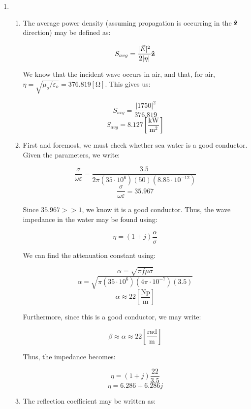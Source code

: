 \begin{enumerate}

  \item

    \begin{enumerate}

      \item 

        The average power density (assuming propagation is occurring in the $\bold{\hat{z}}$ direction) may be defined as:

        $$S_{avg}=\frac{|\vec{E}|^2}{2|\eta|}\bold{\hat{z}}$$

        We know that the incident wave occurs in air, and that, for air, $\eta=\sqrt{\mu_o/\varepsilon_o}=376.819[\si{\ohm}]$. This gives us:

        $$S_{avg}=\frac{|1750|^2}{376.819}$$
        $$\boxed{S_{avg}=8.127\left[ \frac{\si{\kilo\watt}}{\si{\meter\squared}} \right]}$$

      \item 

        First and foremost, we must check whether sea water is a good conductor. Given the parameters, we write:

        $$\frac{\sigma}{\omega\varepsilon}=\frac{3.5}{2\pi(35\cdot10^6)(50)(8.85\cdot10^{-12})}$$
        $$\frac{\sigma}{\omega\varepsilon}=35.967$$

        Since $35.967>>1$, we know it is a good conductor. Thus, the wave impedance in the water may be found using:

        $$\eta=(1+j)\frac{\alpha}{\sigma}$$

        We can find the attenuation constant using:

        $$\alpha=\sqrt{\pi f\mu\sigma}$$
        $$\alpha=\sqrt{\pi(35\cdot10^6)(4\pi\cdot10^{-7})(3.5)}$$
        $$\alpha\approx 22\left[ \frac{\text{Np}}{\si{\meter}} \right]$$

        Furthermore, since this is a good conductor, we may write:

        $$\beta\approx\alpha\approx22\left[ \frac{\text{rad}}{\si{\meter}} \right]$$

        Thus, the impedance becomes:

        $$\eta=(1+j)\frac{22}{3.5}$$
        $$\boxed{\eta=6.286+6.286j}$$

      \item 

        The reflection coefficient may be written as:


\end{enumerate}
\end{enumerate}

